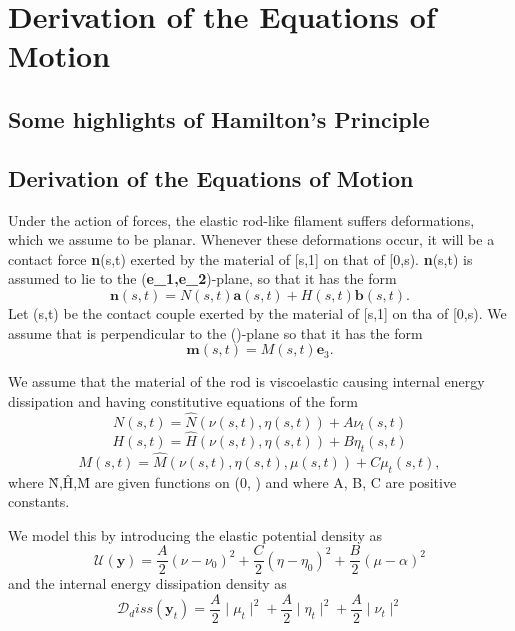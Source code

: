 \documentclass[12pt]{article}
\newcommand{\cB}{B}
\newcommand{\cA}{A}
\newcommand{\cC}{C}
\begin{document}
\section{Derivation of the Equations of Motion
}\label{Derivation of the Equations of Motion
}
\subsection{Some highlights of Hamilton's Principle}
\subsection{Derivation of the Equations of Motion}
Under the action of forces, the elastic rod-like filament suffers deformations, which we assume to be planar. Whenever these deformations occur, it will be a contact force \textbf{n}(s,t) exerted by the material of [s,1] on that of [0,s). \textbf{n}(s,t) is assumed to lie to the (\textbf{e_1,e_2})-plane, so that it has the form
\[  \mathbf{n}(s,t)= N(s,t) \mathbf{a}(s,t) + H(s,t)\mathbf{b} (s,t).
\]
Let (s,t) be the contact couple exerted by the material of [s,1] on tha of [0,s). We assume that  is perpendicular to the ()-plane so that it has the form
\[ 
\mathbf{m}(s,t) = M(s,t)\mathbf{e}_3.
\]

We assume that the material of the rod is viscoelastic causing internal energy dissipation and having constitutive equations of the form
\[  N (s,t)=  \hat{N}(\nu (s,t),\eta (s,t)) + A \nu_t (s,t)
\]
\[  H (s,t)=  \hat{H}(\nu (s,t),\eta (s,t)) + B \eta_t (s,t)
\]
\[  M (s,t)=  \hat{M}(\nu (s,t),\eta (s,t), \mu(s,t)) + C \mu_t (s,t),
\]
where \^{N},\^{H},\^{M} are given functions on (0, \infty ) \textmultiply {} \textmultiply {} and where A, B, C are positive constants.

We model this by introducing the elastic potential density  as
\[ \mathcal{U}(\mathbf{y}) = \frac{\cA}{2} (\nu - \nu_0)^2
+\frac{\cC}{2} (\eta - \eta_0 )^2
+\frac{\cB}{2} (\mu -\alpha)^2 
\]
and the internal energy dissipation density as 
\[ \mathcal{D}_diss(\mathbf{y}_t) = \frac{A}{2}\mid\mu_t\mid^2
+\frac{A}{2}\mid\eta_t\mid^2
+\frac{A}{2}\mid\nu_t\mid^2
\]
\end{document}
